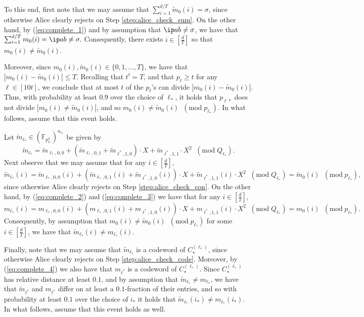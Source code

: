 \documentclass[11pt]{article}
\theoremstyle{plain}
\theoremstyle{remark}
\newcommand{\F}{\mathbb{F}}
\begin{document}
To this end, first note that we may assume that $\sum_{i=1}^{d/T} \tilde m_0(i) = \sigma$, since otherwise Alice clearly rejects on Step \ref{step:alice_check_sum}. 
On the other hand,  by (\ref{eq:complete_1}) and by assumption that $\ip a b \neq \sigma$,  we have that
 $
 \sum_{i=1}^{d/T} m_0 (i)  = \ip a b \neq \sigma.
 $
Consequently, there exists $i \in [\frac d T]$ so that $m_0 (i) \neq \tilde m_0 (i)$. 

Moreover, since $m_0(i), \tilde m_0(i) \in \{0,1,\ldots,T\}$, we have that $|m_0(i) - \tilde m_0(i)|\leq T$. Recalling that 
$t^t = T$, and that $p_\ell \geq t$ for any $\ell \in [10t]$, we conclude that at most $t$ of the $p_\ell$'s can divide $|m_0(i) - \tilde m_0(i)|$.
Thus, with probability at least $0.9$ over the choice of $\ell_*$, it holds that  $p_{\ell*}$ does not divide $|m_0(i) \neq \tilde m_0(i) |$, and so $m_0(i) \neq \tilde m_0(i) \;\;(\mathrm{mod} \;p_{\ell_*})$. In what follows, assume that this event holds.

Let $\tilde m_{\ell_*} \in (\F_{p_{\ell_*}^2})^{n_{\ell_*}}$ be given by 
$$  \tilde m_{\ell_*} = 
   \tilde   m_{\ell_*,0,0}   + ( \tilde m_{\ell_*,0,1}   + \tilde m_{\ell^*,1,0} ) \cdot X +  \tilde m_{\ell^*,1,1}   \cdot X^2   \;\;(\mathrm{mod} \;Q_{\ell_*}).$$
Next observe that we may assume that for any $i \in [\frac d T]$,
$$
  \tilde m_{\ell_*} (i)  = 
   \tilde   m_{\ell_*,0,0}  (i)  + ( \tilde m_{\ell_*,0,1} (i)  + \tilde m_{\ell^*,1,0} (i)) \cdot X +  \tilde m_{\ell^*,1,1}  (i) \cdot X^2   \;\;(\mathrm{mod} \;Q_{\ell_*}) 
=    \tilde m_0(i) \;\;(\mathrm{mod} \;p_{\ell_*}),
$$
   since otherwise Alice clearly rejects on Step \ref{step:alice_check_con}. 
On the other hand, by (\ref{eq:complete_2}) and (\ref{eq:complete_3})
 we have that for any $i \in [\frac d T]$,
$$
 m_{\ell_*} (i)  = 
   m_{\ell_*,0,0}  (i)  + (m_{\ell_*,0,1} (i)  +  m_{\ell^*,1,0} (i)) \cdot X + m_{\ell^*,1,1}  (i) \cdot X^2   \;\;(\mathrm{mod} \;Q_{\ell_*}) 
=    m_0(i) \;\;(\mathrm{mod} \;p_{\ell_*}).
$$
Consequently, by assumption that $m_0(i) \neq \tilde m_0(i) \;\;(\mathrm{mod} \;p_{\ell_*})$ for some $i \in [\frac d T]$, we have that $\tilde m_{\ell_*}(i) \neq m_{\ell_*}(i)$.

Finally, note that we may assume that $\tilde m_{\ell_*}$ is a codeword of $C_\star^{(\ell_*)}$, since otherwise Alice clearly rejects on Step \ref{step:alice_check_code}. Moreover, by (\ref{eq:complete_4}) we also have that $m_{\ell^*}$ is a codeword of $C_\star^{(\ell_*)}$. Since $C_\star^{(\ell_*)}$ has relative distance at least $0.1$, and by assumption that $\tilde m_{\ell_*} \neq m_{\ell_*}$, we have that $\tilde m_{\ell^*}$ and $m_{\ell^*}$ differ on at least a $0.1$-fraction of their entries, and so with probability at least $0.1$ over the choice of $i_*$ it holds that $\tilde m_{\ell_*} (i_*) \neq m_{\ell_*} (i_*)$. In what follows, assume that this event holds as well.
\end{document}

